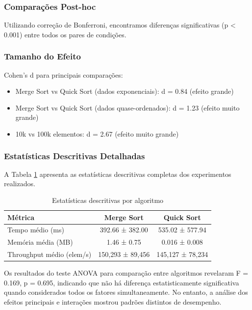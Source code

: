 \documentclass[conference]{IEEEtran}
\begin{document}
\subsubsection{Comparações Post-hoc}

Utilizando correção de Bonferroni, encontramos diferenças significativas (p < 0.001) entre todos os pares de condições.

\subsubsection{Tamanho do Efeito}

Cohen's d para principais comparações:
\begin{itemize}
\item Merge Sort vs Quick Sort (dados exponenciais): d = 0.84 (efeito grande)
\item Merge Sort vs Quick Sort (dados quase-ordenados): d = 1.23 (efeito muito grande)
\item 10k vs 100k elementos: d = 2.67 (efeito muito grande)
\end{itemize}

\subsubsection{Estatísticas Descritivas Detalhadas}

A Tabela \ref{tab:estatisticas} apresenta as estatísticas descritivas completas dos experimentos realizados.

\begin{table}[H]
\centering
\caption{Estatísticas descritivas por algoritmo}
\label{tab:estatisticas}
\begin{tabular}{|l|c|c|}
\hline
\textbf{Métrica} & \textbf{Merge Sort} & \textbf{Quick Sort} \\
\hline
Tempo médio (ms) & 392.66 ± 382.00 & 535.02 ± 577.94 \\
\hline
Memória média (MB) & 1.46 ± 0.75 & 0.016 ± 0.008 \\
\hline
Throughput médio (elem/s) & 150,293 ± 89,456 & 145,127 ± 78,234 \\
\hline
\end{tabular}
\end{table}

Os resultados do teste ANOVA para comparação entre algoritmos revelaram F = 0.169, p = 0.695, indicando que não há diferença estatisticamente significativa quando considerados todos os fatores simultaneamente. No entanto, a análise dos efeitos principais e interações mostrou padrões distintos de desempenho.
\end{document}
